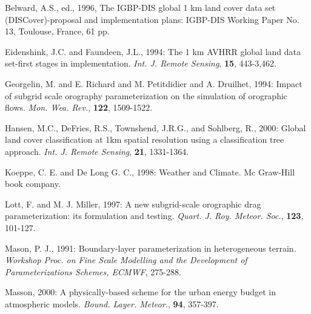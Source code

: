 \begin{description}

\item
Belward, A.S., ed., 1996, The IGBP-DIS global 1 km land cover data set
(DISCover)-proposal and implementation plans: IGBP-DIS  Working Paper No. 13,
Toulouse, France, 61 pp.

\item
Eidenshink, J.C. and Faundeen, J.L., 1994:
The 1 km AVHRR global land data
set-first stages in implementation. {\it Int. J. Remote Sensing},
{\bf 15}, 443-3,462.

\item
Georgelin, M. and E. Richard and M. Petitdidier and A. Druilhet, 1994:
Impact of subgrid scale orography parameterization on the
simulation of orographic flows. {\it Mon. Wea. Rev.}, {\bf 122},
1509-1522.

\item
Hansen, M.C., DeFries, R.S., Townshend, J.R.G., and Sohlberg, R., 2000:
Global land  cover classification at 1km spatial resolution using
a classification tree  approach. {\it Int. J. Remote Sensing},
{\bf 21}, 1331-1364.

\item
Koeppe, C. E. and De Long G. C., 1998:
Weather and Climate. Mc Graw-Hill book company.

\item
Lott, F. and M. J. Miller, 1997:
A new subgrid-scale orographic drag parameterization: its formulation
and testing. {\it Quart. J. Roy. Meteor. Soc.}, {\bf 123}, 101-127.

\item
Mason, P. J., 1991:
Boundary-layer parameterization in heterogeneous terrain.
{\it Workshop Proc. on Fine Scale Modelling and the
Development of Parameterizations Schemes, ECMWF},
275-288.

\item
Masson, 2000:
A physically-based scheme for the urban energy budget in atmospheric models.
{\it Bound. Layer. Meteor.},  {\bf 94}, 357-397.

\end{description}

